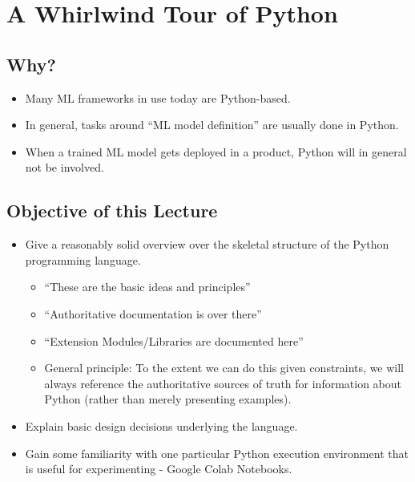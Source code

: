 \documentclass[11pt]{article}
\providecommand{\tightlist}{%
      \setlength{\itemsep}{0pt}\setlength{\parskip}{0pt}}
\begin{document}
    
    \hypertarget{a-whirlwind-tour-of-python}{%
\section{A Whirlwind Tour of Python}\label{a-whirlwind-tour-of-python}}

\hypertarget{why}{%
\subsection{Why?}\label{why}}

\begin{itemize}
\tightlist
\item
  Many ML frameworks in use today are Python-based.
\item
  In general, tasks around ``ML model definition'' are usually done in
  Python.
\item
  When a trained ML model gets deployed in a product, Python will in
  general not be involved.
\end{itemize}

\hypertarget{objective-of-this-lecture}{%
\subsection{Objective of this Lecture}\label{objective-of-this-lecture}}

\begin{itemize}
\tightlist
\item
  Give a reasonably solid overview over the skeletal structure of the
  Python programming language.

  \begin{itemize}
  \tightlist
  \item
    ``These are the basic ideas and principles''
  \item
    ``Authoritative documentation is over there''
  \item
    ``Extension Modules/Libraries are documented here''
  \item
    General principle: To the extent we can do this given constraints,
    we will always reference the authoritative sources of truth for
    information about Python (rather than merely presenting examples).
  \end{itemize}
\item
  Explain basic design decisions underlying the language.
\item
  Gain some familiarity with one particular Python execution environment
  that is useful for experimenting - Google Colab Notebooks.
\end{itemize}
\end{document}
